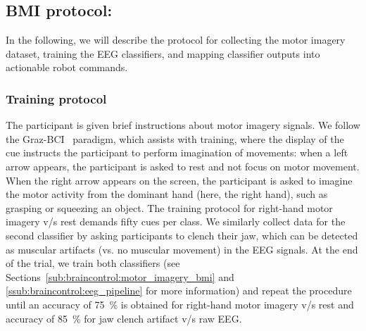 \documentclass[letterpaper, 10pt, conference]{ieeeconf}      %
\begin{document}
\subsection{BMI protocol:}\label{sub:braincontrol:bmi_protocol}
In the following, we will describe the protocol for collecting the motor imagery dataset, training the \gls{EEG} classifiers, and mapping classifier outputs into actionable robot commands.

\subsubsection{Training protocol}

The participant is given brief instructions about motor imagery signals.
We follow the Graz-BCI~\cite{roc2021review} paradigm, which assists with training, where the display of the cue instructs the participant to perform imagination of movements: when a left arrow appears, the participant is asked to rest and not focus on motor movement. When the right arrow appears on the screen, the participant is asked to imagine the motor activity from the dominant hand (here, the right hand), such as grasping or squeezing an object. The training protocol for right-hand motor imagery v/s rest demands fifty cues per class. 
We similarly collect data for the second classifier by asking participants to clench their jaw, which can be detected as muscular artifacts (vs. no muscular movement) in the \gls{EEG} signals.
At the end of the trial, we train both classifiers (see Sections~\ref{sub:braincontrol:motor_imagery_bmi} and \ref{ssub:braincontrol:eeg_pipeline} for more information) and repeat the procedure until an accuracy of \SI{75}{\percent} is obtained for right-hand motor imagery v/s rest and accuracy of \SI{85}{\percent} for jaw clench artifact v/s raw EEG.
\end{document}
